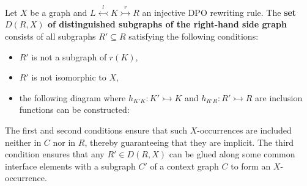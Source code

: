 \begin{definition}
    \label{subgraph_counting:def:rx}
    Let \(X\) be a graph and 
    \(
        L \overset{l}{\leftarrowtail} K \overset{r}{\rightarrowtail} R
    \) an injective DPO rewriting rule.
    The \textbf{set \(D(R,X)\) of distinguished subgraphs of the right-hand side graph} consists of all subgraphs \( R' \mathop{\subseteq} R \)
    satisfying the following conditions:
    \begin{itemize}
        \item $R'$ is not a subgraph of $r(K)$,
        \item $R'$ is not isomorphic to $X$,
        \item the following diagram where \(h_{K'K} \mathop{\colon} K' \rightarrowtail K \) and \(h_{R'R} \mathop{\colon} R' \rightarrowtail R \) are inclusion functions can be constructed:
        \begin{center}
        \end{center}
    \end{itemize}
\end{definition}  
The first and second conditions ensure that such $X$-occurrences are included neither in \( C \) nor in \( R \), thereby guaranteeing that they are implicit.
The third condition ensures that any $R' \mathop{\in} D(R,X)$ can be glued along some common interface elements with a subgraph $C'$ of a context graph \( C \) to form an \( X \)-occurrence. 


